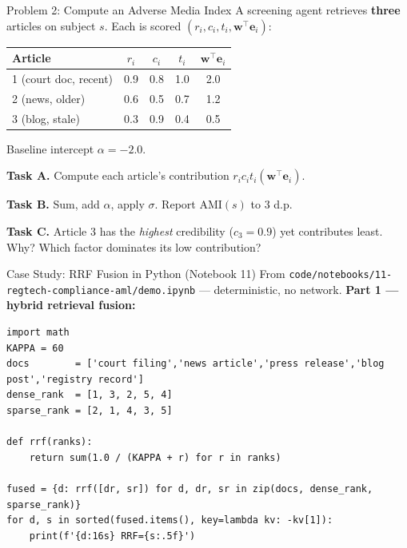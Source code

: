 \documentclass[9pt,t]{beamer}
\begin{document}
\begin{frame}{Problem 2: Compute an Adverse Media Index}
A screening agent retrieves \textbf{three} articles on subject $s$. Each is scored
$(r_i, c_i, t_i, \mathbf{w}^{\top}\mathbf{e}_i)$:

\medskip
\begin{tabular}{lcccc}
\toprule
\textbf{Article} & $r_i$ & $c_i$ & $t_i$ & $\mathbf{w}^{\top}\mathbf{e}_i$ \\
\midrule
1 (court doc, recent)   & 0.9 & 0.8 & 1.0 & 2.0 \\
2 (news, older)         & 0.6 & 0.5 & 0.7 & 1.2 \\
3 (blog, stale)         & 0.3 & 0.9 & 0.4 & 0.5 \\
\bottomrule
\end{tabular}

\medskip
Baseline intercept $\alpha = -2.0$.

\medskip
\textbf{Task A.} Compute each article's contribution $r_i c_i t_i (\mathbf{w}^{\top}\mathbf{e}_i)$.

\textbf{Task B.} Sum, add $\alpha$, apply $\sigma$. Report $\mathrm{AMI}(s)$ to 3 d.p.

\textbf{Task C.} Article 3 has the \emph{highest} credibility ($c_3=0.9$) yet
contributes least. Why? Which factor dominates its low contribution?
\end{frame}

\begin{frame}[fragile]{Case Study: RRF Fusion in Python (Notebook 11)}
From \texttt{code/notebooks/11-regtech-compliance-aml/demo.ipynb} --- deterministic,
no network. \textbf{Part 1 --- hybrid retrieval fusion:}

\begin{lstlisting}
import math
KAPPA = 60
docs        = ['court filing','news article','press release','blog post','registry record']
dense_rank  = [1, 3, 2, 5, 4]
sparse_rank = [2, 1, 4, 3, 5]

def rrf(ranks):
    return sum(1.0 / (KAPPA + r) for r in ranks)

fused = {d: rrf([dr, sr]) for d, dr, sr in zip(docs, dense_rank, sparse_rank)}
for d, s in sorted(fused.items(), key=lambda kv: -kv[1]):
    print(f'{d:16s} RRF={s:.5f}')
\end{lstlisting}
\end{frame}
\end{document}
